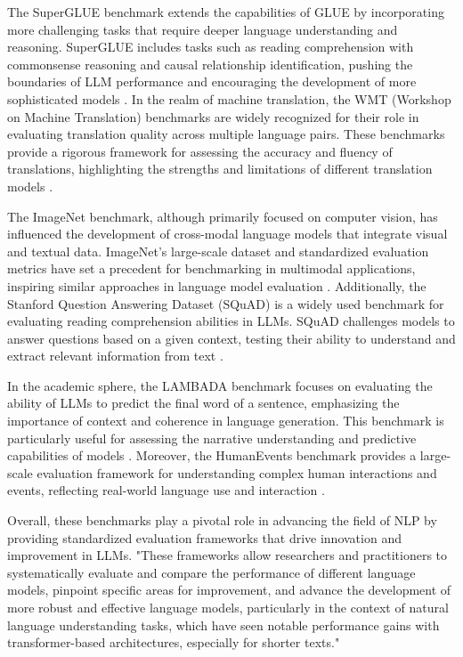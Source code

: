 The SuperGLUE benchmark extends the capabilities of GLUE by incorporating more challenging tasks that require deeper language understanding and reasoning. SuperGLUE includes tasks such as reading comprehension with commonsense reasoning and causal relationship identification, pushing the boundaries of LLM performance and encouraging the development of more sophisticated models \cite{wei2022chain}. In the realm of machine translation, the WMT (Workshop on Machine Translation) benchmarks are widely recognized for their role in evaluating translation quality across multiple language pairs. These benchmarks provide a rigorous framework for assessing the accuracy and fluency of translations, highlighting the strengths and limitations of different translation models \cite{bogoychev2020domaintranslationesenoisesynthetic}.



The ImageNet benchmark, although primarily focused on computer vision, has influenced the development of cross-modal language models that integrate visual and textual data. ImageNet's large-scale dataset and standardized evaluation metrics have set a precedent for benchmarking in multimodal applications, inspiring similar approaches in language model evaluation \cite{thapliyal2022crossmodal3600massivelymultilingualmultimodal}. Additionally, the Stanford Question Answering Dataset (SQuAD) is a widely used benchmark for evaluating reading comprehension abilities in LLMs. SQuAD challenges models to answer questions based on a given context, testing their ability to understand and extract relevant information from text \cite{kojima2022large}.



In the academic sphere, the LAMBADA benchmark focuses on evaluating the ability of LLMs to predict the final word of a sentence, emphasizing the importance of context and coherence in language generation. This benchmark is particularly useful for assessing the narrative understanding and predictive capabilities of models \cite{yamshchikov2020styletransferparaphraselookingsensible}. Moreover, the HumanEvents benchmark provides a large-scale evaluation framework for understanding complex human interactions and events, reflecting real-world language use and interaction \cite{lin2023humaneventslargescalebenchmark}.



Overall, these benchmarks play a pivotal role in advancing the field of NLP by providing standardized evaluation frameworks that drive innovation and improvement in LLMs. "These frameworks allow researchers and practitioners to systematically evaluate and compare the performance of different language models, pinpoint specific areas for improvement, and advance the development of more robust and effective language models, particularly in the context of natural language understanding tasks, which have seen notable performance gains with transformer-based architectures, especially for shorter texts." \cite{ginzburg2021selfsuperviseddocumentsimilarityranking}



